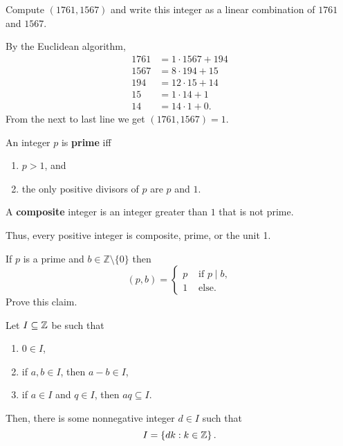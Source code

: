 \documentclass[11pt,a4paper]{article}
\begin{document}
\begin{eje}
    Compute \((1761, 1567)\) and write this integer as a linear combination of \(1761\) and \(1567\).
\end{eje}

\begin{sol} By the Euclidean algorithm,
   \begin{align*}
    1761 &= 1\cdot 1567 + 194\\
    1567 &= 8\cdot194 + 15\\
    194  &= 12\cdot 15 + 14\\
    15   &= 1\cdot 14 + 1 \\
    14   &= 14\cdot 1 + 0.
   \end{align*}
   From the next to last line we get \((1761,1567) = 1\).
\end{sol}

\begin{defi}
    An integer \(p\) is \textbf{prime} iff 
    \begin{enumerate}[label=(\roman*)]
        \item \(p>1\), and
        \item the only positive divisors of \(p\) are \(p\) and \(1\).
    \end{enumerate}
    A \textbf{composite} integer is an integer greater than \(1\) that is not prime.
\end{defi}

Thus, every positive integer is composite, prime, or the unit 1.

\begin{rem}\label{rmk:gcd.of.prime.and.integer}
    If $p$ is a prime and $b \in \mathbb{Z}\setminus \{0\}$ then
\[
(p, b)= \begin{cases}p & \text { if } p \mid b, \\ 1 & \text { else.}\end{cases}
\]
Prove this claim.
\end{rem}

\begin{prop}
    Let \(I\subseteq \mathbb{Z}\) be such that 
    \begin{enumerate}[label=(\roman*)]
        \item\label{lab:i.exercise.ideal.of.Z} \(0\in I\),
        \item\label{lab:ii.exercise.ideal.of.Z} if  \(a,b\in I\), then \(a-b\in I\), 
        \item\label{lab:iii.exercise.ideal.of.Z} if \(a\in I\) and \(q\in I\), then  \(aq\subseteq I\).
    \end{enumerate}
    Then, there is some nonnegative integer \(d\in I\) such that  \[I = \left\{ dk: k \in \mathbb{Z} \right\}.\]
\end{prop}
\end{document}
